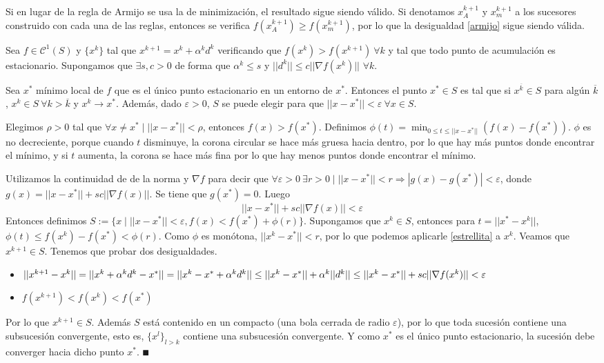 \documentclass[MIOP.tex]{subfiles}
\begin{document}
\begin{nota}
Si en lugar de la regla de Armijo se usa la de minimización, el resultado sigue siendo válido. Si denotamos $x^{k+1}_A$ y $x^{k+1}_m$ a los sucesores construido con cada una de las reglas, entonces se verifica $f(x^{k+1}_A)\geq f(x^{k+1}_m)$, por lo que la desigualdad \ref{armijo} sigue siendo válida.
\end{nota}

\begin{teorema}[de captura]
Sea $f\in\mathcal{C}^1(S)$ y $\{x^k\}$ tal que $x^{k+1}=x^k+\alpha^k d^k$ verificando que $f(x^k)>f(x^{k+1})\ \forall k$ y tal que todo punto de acumulación es estacionario. Supongamos que $\exists s,c>0$ de forma que $\alpha^k\leq s$ y $||d^k||\leq c||\nabla f(x^k)||$ $\forall k.$

Sea $x^*$ mínimo local de $f$ que es el único punto estacionario en un entorno de $x^*$. Entonces el punto $x^*\in S$ es tal que si $x^{\overline{k}}\in S$ para algún $\overline{k}$, $x^k\in S\ \forall k>\overline{k}$ y $x^k\to x^*$. Además, dado $\varepsilon>0$, $S$ se puede elegir para que $||x-x^*||<\varepsilon \ \forall x\in S$.
\end{teorema}
\begin{dem}
Elegimos $\rho>0$ tal que $\forall x\neq x^*\mid ||x-x^*||<\rho$, entonces $f(x)>f(x^*)$. Definimos $\phi
(t)=\min_{0\leq t\leq ||x-x^*||} (f(x)-f(x^*))$. $\phi$ es no decreciente, porque cuando $t$ disminuye, la corona circular se hace más gruesa hacia dentro, por lo que hay más puntos donde encontrar el mínimo, y si $t$ aumenta, la corona se hace más fina por lo que hay menos puntos donde encontrar el mínimo.

Utilizamos la continuidad de de la norma y $\nabla f$ para decir que $\forall \varepsilon>0\ \exists r>0\mid ||x-x^*||<r\Rightarrow |g(x)-g(x^*)|<\varepsilon$, donde $g(x)=||x-x^*||+sc||\nabla f(x)||$. Se tiene que $g(x^*)=0$. Luego
\begin{equation}\label{estrellita}
||x-x^*||+sc||\nabla f(x)||<\varepsilon 
\end{equation}
Entonces definimos $S:=\{x\mid ||x-x^*||<\varepsilon, f(x)< f(x^*)+\phi(r)\}$. Supongamos que $x^k\in S$, entonces para $t=||x^*-x^k||$, $\phi(t)\leq f(x^k)-f(x^*)<\phi(r)$. Como $\phi$ es monótona, $||x^k-x^*||<r$, por lo que podemos aplicarle \ref{estrellita} a $x^k$. Veamos que $x^{k+1}\in S$. Tenemos que probar dos desigualdades.
\begin{itemize}
\item $||x^{k+1}-x^k||=||x^k+\alpha^kd^k-x^*||=||x^k-x^*+\alpha^kd^k||\leq ||x^k-x^*||+\alpha^k||d^k||\leq\\ ||x^k-x^*||+sc||\nabla f(x^k)||<\varepsilon$
\item $f(x^{k+1})<f(x^k)<f(x^*)$
\end{itemize}
Por lo que $x^{k+1}\in S$. Además $S$ está contenido en un compacto (una bola cerrada de radio $\varepsilon$), por lo que toda sucesión contiene una subsucesión convergente, esto es, $\{x^l\}_{l>k}$ contiene una subsucesión convergente. Y como $x^*$ es el único punto estacionario, la sucesión debe converger hacia dicho punto $x^*$. $\QED$
\end{dem}
\end{document}
